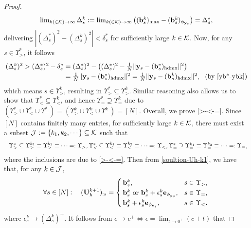 \documentclass[journal]{IEEEtran}
\newcommand{\ba}{\begin{array}}
\newcommand{\ea}{\end{array}}
\newcommand{\be}{\begin{equation}}
\newcommand{\ee}{\end{equation}}
\def\U{{\bf U}}
\def\b{{\bf b}}
\def\e{{\bf e}}
\def\hd{{\rm hdmx}}
\def\y{{\bf y}}
\begin{document}
\begin{proof}
\begin{eqnarray}
\begin{array}{lll}
 \lim_{k(\in{\cal K})\to\infty}\Delta_s^k:= \lim_{k(\in{\cal K})\to\infty}\left((\b^{k}_s)_{\max}-(\b^{k}_s)_{\phi_{\y_s}}\right)=\Delta_s^*,
 \end{array}
\end{eqnarray}
delivering  $|(\Delta_s^*)^2-(\Delta_s^k)^2| < \delta_s^*$ for sufficiently large $k\in\cal K$. Now, for any $s\in  \Upsilon^*_> $, it follows
\begin{eqnarray*}
 \arraycolsep=1.4pt\def\arraystretch{1.25}
 \begin{array}{lll}
(\Delta_s^k)^2 > (\Delta_s^*)^2 - \delta_s^* &=& (\Delta_s^*)^2 - \left((\Delta_s^*)^2 - \frac{1}{N}\|\y_s-(\b^*_s)_\hd \|^2\right)\\
& =& \frac{1}{N}\|\y_s-(\b^*_s)_\hd \|^2  = \frac{1}{N}\|\y_s-(\b^k_s)_\hd \|^2, ~~(\text{by \eqref{yb*-ybk}})
\end{array}
\end{eqnarray*}
which means  $s\in  \Upsilon^k_> $, resulting in $\Upsilon^*_> \subseteq \Upsilon^k_>$. Similar reasoning also allows us to show that $\Upsilon^*_< \subseteq \Upsilon^k_<$, and hence $\Upsilon^*_= \supseteq \Upsilon^k_=$ due to $(\Upsilon^*_>\cup \Upsilon^*_< \cup \Upsilon^*_=) =(\Upsilon^k_>\cup \Upsilon^k_< \cup \Upsilon^k_=)=[N]$. Overall, we prove \eqref{>-<-=}. Since $[N]$ contains finitely many entries, for sufficiently large $k\in\cal K$, there must exist a subset ${\cal J}:=\{k_1,k_2,\cdots\} \subseteq \cal K$ such that
\be\label{G-In2-W-J}
\arraycolsep=1.4pt\def\arraystretch{1.25}
 \ba{lclll}
&& \Upsilon^*_> \subseteq \Upsilon^{k_1}_> \equiv \Upsilon^{k_2}_> \equiv \cdots  =: \Upsilon_>, \Upsilon^*_< \subseteq \Upsilon^{k_1}_< \equiv \Upsilon^{k_2}_< \equiv \cdots=: \Upsilon_<,\Upsilon^*_= \supseteq \Upsilon^{k_1}_= \equiv \Upsilon^{k_2}_= \equiv \cdots=: \Upsilon_=,
\ea
\ee
where the inclusions are due to \eqref{>-<-=}. Then from \eqref{soultion-Uh-k1}, we have that, for any $k\in\cal J$,
\begin{eqnarray} \label{uk+1}
 \arraycolsep=1.4pt\def\arraystretch{1.25}
\forall s\in[N]:~~~(\U_h^{k+1})_{:s}=  \left\{\begin{array}{lll}
\b^{k}_s, & s\in \Upsilon_>,\\
\b^{k}_s~ \text{or}~\b^{k}_s+\epsilon_s^k \e_{\phi_{\y_s}}, ~~& s\in \Upsilon_=,\\
 \b^{k}_s+\epsilon_s^k \e_{{\phi_{\y_s}}}, & s\in \Upsilon_<.
\end{array}\right.
\end{eqnarray}
where $\epsilon_s^k\to (\Delta_s^k)^+$. It follows from $\epsilon \to c^+ \Leftrightarrow \epsilon= \lim_{t\to 0^+}  (c + t)$  that

\end{proof}
\end{document}

